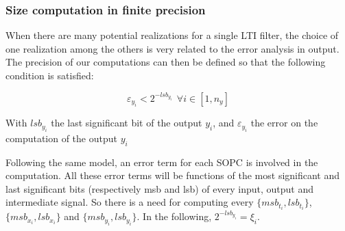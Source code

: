 

	\subsubsection{Size computation in finite precision}
	When there are many potential realizations for a single LTI filter, the choice of one realization
	among the others is very related to the error analysis in output.
	The precision of our computations can then be defined so that the following condition is satisfied:

	\begin{equation} \label{condition}
		\varepsilon_{y_i} < 2^{-lsb_{y_i}} \hspace{5pt} \forall i \in [1,n_y]
	\end{equation}

	With $lsb_{y_i}$ the last significant bit of the output $y_i$, and $\varepsilon_{y_i}$ the error on the computation of the output $y_i$

	Following the same model, an error term for each SOPC is involved in the computation.
	All these error terms will be functions of the most significant and last significant bits (respectively msb and lsb) of every input, output and intermediate signal.
	So there is a need for computing every $\{msb_{t_i},lsb_{t_i}\}$, $\{msb_{x_i},lsb_{x_i}\}$ and $\{msb_{y_i},lsb_{y_i}\}$.
	In the following, $2^{-lsb_{y_i}}=\xi_i$.

%


